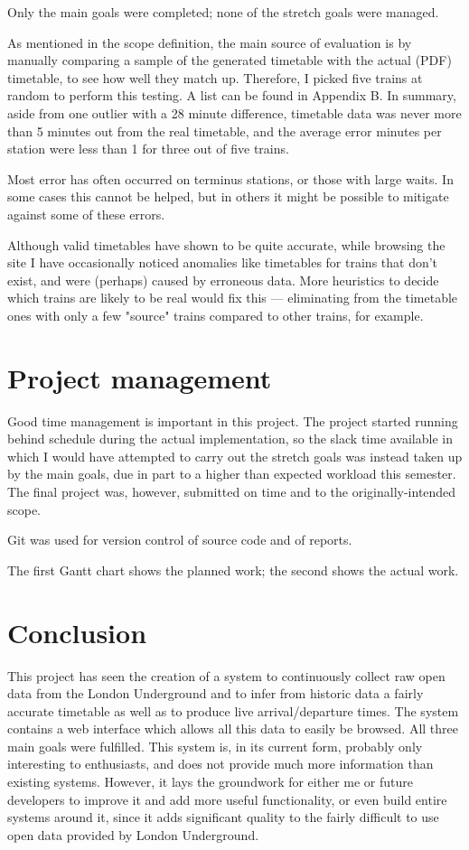 \documentclass[a4paper,12pt,twoside]{report}
\begin{document}
Only the main goals were completed; none of the stretch goals were managed.

As mentioned in the scope definition, the main source of evaluation is by
manually comparing a sample of the generated timetable with the actual (PDF)
timetable, to see how well they match up. Therefore, I picked five trains at
random to perform this testing. A list can be found in Appendix B. In summary,
aside from one outlier with a 28 minute difference, timetable data was never
more than 5 minutes out from the real timetable, and the average error minutes
per station were less than 1 for three out of five trains.

Most error has often occurred on terminus stations, or those with large waits.
In some cases this cannot be helped, but in others it might be possible to
mitigate against some of these errors.

Although valid timetables have shown to be quite accurate, while browsing the
site I have occasionally noticed anomalies like timetables for trains that
don't exist, and were (perhaps) caused by erroneous data. More heuristics to
decide which trains are likely to be real would fix this --- eliminating from
the timetable ones with only a few "source" trains compared to other trains,
for example.

\chapter{Project management}

Good time management is important in this project. The project started running
behind schedule during the actual implementation, so the slack time available
in which I would have attempted to carry out the stretch goals was instead
taken up by the main goals, due in part to a higher than expected workload this
semester. The final project was, however, submitted on time and to the
originally-intended scope.

Git was used for version control of source code and of reports.

The first Gantt chart shows the planned work; the second shows the actual work.




\chapter{Conclusion}

This project has seen the creation of a system to continuously collect raw open
data from the London Underground and to infer from historic data a fairly
accurate timetable as well as to produce live arrival/departure times. The
system contains a web interface which allows all this data to easily be
browsed. All three main goals were fulfilled. This system is, in its current
form, probably only interesting to enthusiasts, and does not provide much more
information than existing systems. However, it lays the groundwork for either
me or future developers to improve it and add more useful functionality, or
even build entire systems around it, since it adds significant quality to the
fairly difficult to use open data provided by London Underground.
\end{document}
